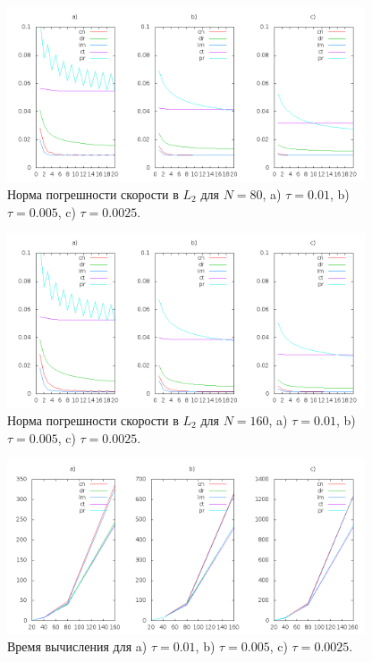 \documentclass[12pt]{article}
\begin{document}
\begin{figure}
	\begin{center}
		\includegraphics[width=400px]{data160/error_3}
		\caption{Норма погрешности скорости в $L_2$ для $N=80$, a) $\tau=0.01$, b) $\tau=0.005$, c) $\tau=0.0025$.}
		\label{fg:scheme-L2-3}
	\end{center}
\end{figure}

\begin{figure}
	\begin{center}
		\includegraphics[width=400px]{data160/error_4}
		\caption{Норма погрешности скорости в $L_2$ для $N=160$, a) $\tau=0.01$, b) $\tau=0.005$, c) $\tau=0.0025$.}
		\label{fg:scheme-L2-4}
	\end{center}
\end{figure}

\begin{figure}
	\begin{center}
		\includegraphics[width=400px]{data160/scheme-time}
		\caption{Время вычисления для a) $\tau=0.01$, b) $\tau=0.005$, c) $\tau=0.0025$.}
		\label{fg:scheme-time}
	\end{center}
\end{figure}
\end{document}
